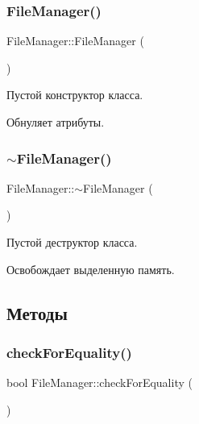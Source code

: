 \subsubsection{\texorpdfstring{File\+Manager()}{FileManager()}\hspace{0.1cm}{\footnotesize\ttfamily [3/3]}}
{\footnotesize\ttfamily File\+Manager\+::\+File\+Manager (\begin{DoxyParamCaption}{ }\end{DoxyParamCaption})}



Пустой конструктор класса. 

Обнуляет атрибуты. \hypertarget{class_file_manager_abaed33b5b0c13b8a597db9335a1aacfa}{}\label{class_file_manager_abaed33b5b0c13b8a597db9335a1aacfa} 
\subsubsection{\texorpdfstring{$\sim$\+File\+Manager()}{~FileManager()}}
{\footnotesize\ttfamily File\+Manager\+::$\sim$\+File\+Manager (\begin{DoxyParamCaption}{ }\end{DoxyParamCaption})}



Пустой деструктор класса. 

Освобождает выделенную память. 

\subsection{Методы}
\hypertarget{class_file_manager_ab490a5a5882d33781dcb6d1d42945d97}{}\label{class_file_manager_ab490a5a5882d33781dcb6d1d42945d97} 
\subsubsection{\texorpdfstring{check\+For\+Equality()}{checkForEquality()}}
{\footnotesize\ttfamily bool File\+Manager\+::check\+For\+Equality (\begin{DoxyParamCaption}{ }\end{DoxyParamCaption})}



